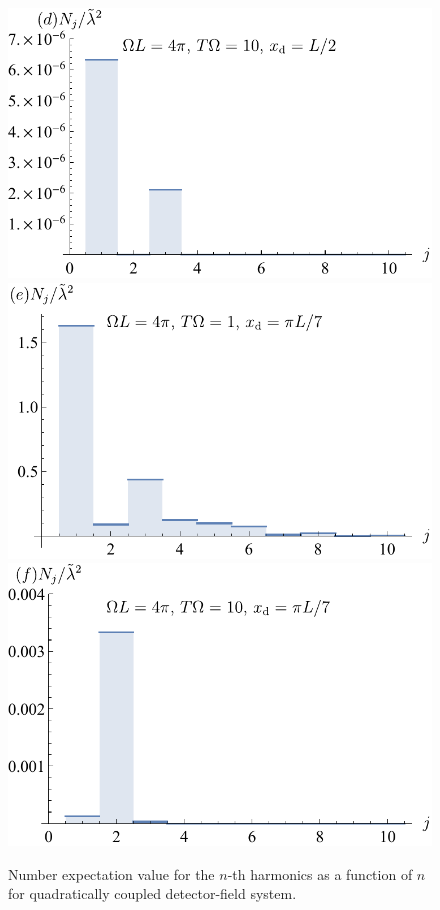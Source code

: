 \documentclass[prd,twocolumn,superscriptaddress,nofootinbib,floatfix,amsmath,amssymb]{revtex4-2}
\begin{document}
\begin{figure}[tp]
        \includegraphics[scale=0.5]{Fig8d.pdf}
        \includegraphics[scale=0.5]{Fig8e.pdf}
        \includegraphics[scale=0.5]{Fig8f.pdf} \caption{Number expectation value for the $n$-th harmonics as a function of $n$ for quadratically coupled detector-field system. }
        \label{fig: quadraticdeposit1}
    \end{figure} 
        
\end{document}
